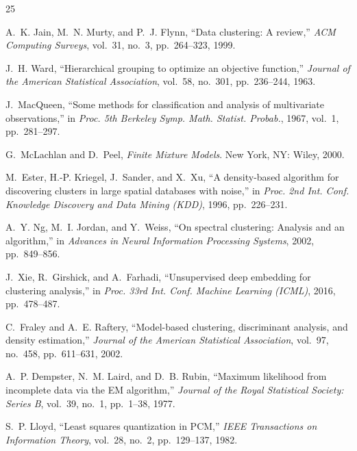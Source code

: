 \documentclass[conference]{IEEEtran}
\begin{document}



\begin{thebibliography}{25}

A.~K. Jain, M.~N. Murty, and P.~J. Flynn,
``Data clustering: A review,''
\textit{ACM Computing Surveys}, vol.~31, no.~3, pp.~264--323, 1999.

J.~H. Ward,
``Hierarchical grouping to optimize an objective function,''
\textit{Journal of the American Statistical Association}, vol.~58, no.~301, pp.~236--244, 1963.

J.~MacQueen,
``Some methods for classification and analysis of multivariate observations,''
in \textit{Proc. 5th Berkeley Symp. Math. Statist. Probab.}, 1967, vol.~1, pp.~281--297.

G.~McLachlan and D.~Peel,
\textit{Finite Mixture Models}.
New York, NY: Wiley, 2000.

M.~Ester, H.-P. Kriegel, J.~Sander, and X.~Xu,
``A density-based algorithm for discovering clusters in large spatial databases with noise,''
in \textit{Proc. 2nd Int. Conf. Knowledge Discovery and Data Mining (KDD)}, 1996, pp.~226--231.

A.~Y. Ng, M.~I. Jordan, and Y.~Weiss,
``On spectral clustering: Analysis and an algorithm,''
in \textit{Advances in Neural Information Processing Systems}, 2002, pp.~849--856.

J.~Xie, R.~Girshick, and A.~Farhadi,
``Unsupervised deep embedding for clustering analysis,''
in \textit{Proc. 33rd Int. Conf. Machine Learning (ICML)}, 2016, pp.~478--487.

C.~Fraley and A.~E. Raftery,
``Model-based clustering, discriminant analysis, and density estimation,''
\textit{Journal of the American Statistical Association}, vol.~97, no.~458, pp.~611--631, 2002.

A.~P. Dempster, N.~M. Laird, and D.~B. Rubin,
``Maximum likelihood from incomplete data via the EM algorithm,''
\textit{Journal of the Royal Statistical Society: Series B}, vol.~39, no.~1, pp.~1--38, 1977.

S.~P. Lloyd,
``Least squares quantization in PCM,''
\textit{IEEE Transactions on Information Theory}, vol.~28, no.~2, pp.~129--137, 1982.


\end{thebibliography}
\end{document}

